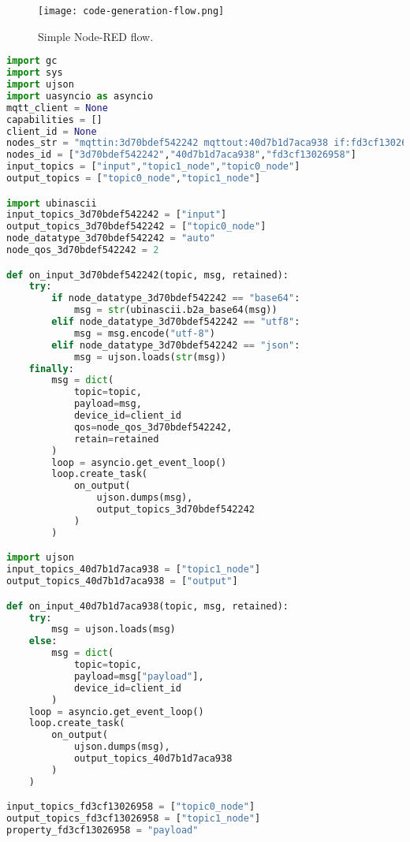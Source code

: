 \begin{figure}[h]
    \centering
    \texttt{[image: code-generation-flow.png]}
    \caption{Simple Node-RED flow.}
    \label{fig:code_generation_flow}
\end{figure}

\begin{lstlisting}[language=Python, caption={Code generated from the flow presented in Figure \ref{fig:code_generation_flow}.}, captionpos=b, label={lst:code_generation}]
import gc
import sys
import ujson
import uasyncio as asyncio
mqtt_client = None
capabilities = []
client_id = None
nodes_str = "mqttin:3d70bdef542242 mqttout:40d7b1d7aca938 if:fd3cf13026958"
nodes_id = ["3d70bdef542242","40d7b1d7aca938","fd3cf13026958"]
input_topics = ["input","topic1_node","topic0_node"]
output_topics = ["topic0_node","topic1_node"]

import ubinascii
input_topics_3d70bdef542242 = ["input"]
output_topics_3d70bdef542242 = ["topic0_node"]
node_datatype_3d70bdef542242 = "auto"
node_qos_3d70bdef542242 = 2

def on_input_3d70bdef542242(topic, msg, retained):
    try:
        if node_datatype_3d70bdef542242 == "base64":
            msg = str(ubinascii.b2a_base64(msg))
        elif node_datatype_3d70bdef542242 == "utf8":
            msg = msg.encode("utf-8")
        elif node_datatype_3d70bdef542242 == "json":
            msg = ujson.loads(str(msg))
    finally:
        msg = dict(
            topic=topic,
            payload=msg,
            device_id=client_id
            qos=node_qos_3d70bdef542242,
            retain=retained
        )
        loop = asyncio.get_event_loop()
        loop.create_task(
            on_output(
                ujson.dumps(msg),
                output_topics_3d70bdef542242
            )
        )

import ujson
input_topics_40d7b1d7aca938 = ["topic1_node"]
output_topics_40d7b1d7aca938 = ["output"]

def on_input_40d7b1d7aca938(topic, msg, retained):
    try:
        msg = ujson.loads(msg)
    else:
        msg = dict(
            topic=topic,
            payload=msg["payload"],
            device_id=client_id
        )            
    loop = asyncio.get_event_loop()
    loop.create_task(
        on_output(
            ujson.dumps(msg),
            output_topics_40d7b1d7aca938
        )
    )

input_topics_fd3cf13026958 = ["topic0_node"]
output_topics_fd3cf13026958 = ["topic1_node"]
property_fd3cf13026958 = "payload"


\end{lstlisting}

